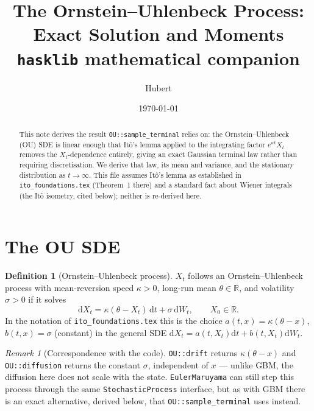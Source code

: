 \documentclass[11pt]{article}
\title{The Ornstein--Uhlenbeck Process: Exact Solution and Moments\\
       \large \texttt{hasklib} mathematical companion}
\author{Hubert}
\date{\today}
\newcommand{\dd}{\mathrm{d}}
\newcommand{\dW}{\dd W_t}
\newcommand{\dt}{\dd t}
\newcommand{\R}{\mathbb{R}}
\newcommand{\drift}{a}
\newcommand{\diff}{b}
\theoremstyle{plain}
\theoremstyle{definition}
\newtheorem{definition}{Definition}
\theoremstyle{remark}
\newtheorem{remark}{Remark}
\begin{document}
\maketitle

\begin{abstract}
This note derives the result \texttt{OU::sample\_terminal} relies on:
the Ornstein--Uhlenbeck (OU) SDE is linear enough that It\^o's lemma
applied to the integrating factor $e^{\kappa t}X_t$ removes the
$X_t$-dependence entirely, giving an exact Gaussian terminal law rather
than requiring discretisation. We derive that law, its mean and
variance, and the stationary distribution as $t\to\infty$. This file
assumes It\^o's lemma as established in \texttt{ito\_foundations.tex}
(Theorem~1 there) and a standard fact about Wiener integrals (the
It\^o isometry, cited below); neither is re-derived here.
\end{abstract}

\section{The OU SDE}

\begin{definition}[Ornstein--Uhlenbeck process]\label{def:ou}
$X_t$ follows an Ornstein--Uhlenbeck process with mean-reversion speed
$\kappa>0$, long-run mean $\theta\in\R$, and volatility $\sigma>0$ if
it solves
\begin{equation}\label{eq:ousde}
   \dd X_t = \kappa(\theta - X_t)\,\dt + \sigma\,\dW, \qquad X_0\in\R.
\end{equation}
In the notation of \texttt{ito\_foundations.tex} this is the choice
$\drift(t,x)=\kappa(\theta-x)$, $\diff(t,x)=\sigma$ (constant) in the
general SDE $\dd X_t = \drift(t,X_t)\dt+\diff(t,X_t)\dW$.
\end{definition}

\begin{remark}[Correspondence with the code]
\texttt{OU::drift} returns $\kappa(\theta-x)$ and
\texttt{OU::diffusion} returns the constant $\sigma$, independent of
$x$ --- unlike GBM, the diffusion here does not scale with the state.
\texttt{EulerMaruyama} can still step this process through the same
\texttt{StochasticProcess} interface, but as with GBM there is an
exact alternative, derived below, that \texttt{OU::sample\_terminal}
uses instead.
\end{remark}
\end{document}
